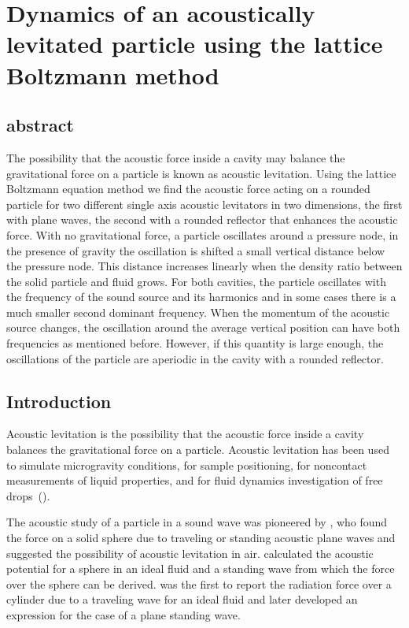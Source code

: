 \chapter{
\label{articulo}
Dynamics of an acoustically levitated particle using the lattice Boltzmann method}

\section{abstract}
 The possibility that the acoustic force inside a cavity may balance the gravitational
 force on a particle is known as acoustic levitation. Using the lattice Boltzmann equation 
 method we find the acoustic force acting on a rounded particle for two different
 single axis acoustic levitators in two dimensions, the first with plane waves, the second 
 with a rounded reflector that enhances the acoustic force. With no gravitational force, 
 a particle oscillates around a pressure node, in the presence of gravity the oscillation 
 is shifted a small vertical distance below the pressure node. This distance increases 
 linearly when the density ratio between the solid particle and fluid grows. For both 
 cavities, the particle oscillates with the frequency of the sound source and its 
 harmonics and in some cases there is a much smaller second dominant frequency. When the 
 momentum of the acoustic source changes, the oscillation around the average vertical 
 position can have both frequencies as mentioned before. However, if this quantity is 
 large enough, the oscillations of the particle are aperiodic in the cavity with a 
 rounded reflector.


\section{\label{sec:intro} Introduction}

Acoustic levitation is the possibility that the acoustic force inside a cavity balances
the gravitational force on a particle. Acoustic levitation has been used to 
simulate microgravity conditions, for sample positioning, for noncontact measurements of 
liquid properties, and for fluid dynamics investigation of free 
drops~(\cite{chung98,hertz95,trinh85,brandt01}). 
 
The acoustic study of a particle in a sound wave was pioneered by \cite{king34}, who found 
the force on a solid sphere due to traveling or standing acoustic plane waves
and suggested the possibility of acoustic levitation in air. \cite{gorkov62} calculated 
the acoustic potential for a sphere in an ideal fluid and a standing wave from 
which the force over the sphere can be derived. \cite{awatani55} was the first to report 
the radiation force over a cylinder due to a traveling wave for an ideal fluid and later 
\cite{wu90} developed an expression for the case of a plane standing wave. 

